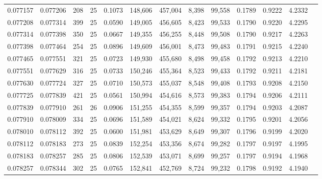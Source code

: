 \begin{tabular}{rrrrrrrrrrrrr}
0.077157 & 0.077206 &   208 &  25 &                                     0.1073 & 148,606 & 457,004 &   8,398 &  99,558 & 0.1789 & 0.9222 & 4.2332 \\
0.077208 & 0.077314 &   399 &  25 &                                     0.0590 & 149,005 & 456,605 &   8,423 &  99,533 & 0.1790 & 0.9220 & 4.2295 \\
0.077314 & 0.077398 &   350 &  25 &                                     0.0667 & 149,355 & 456,255 &   8,448 &  99,508 & 0.1790 & 0.9217 & 4.2263 \\
0.077398 & 0.077464 &   254 &  25 &                                     0.0896 & 149,609 & 456,001 &   8,473 &  99,483 & 0.1791 & 0.9215 & 4.2240 \\
0.077465 & 0.077551 &   321 &  25 &                                     0.0723 & 149,930 & 455,680 &   8,498 &  99,458 & 0.1792 & 0.9213 & 4.2210 \\
0.077551 & 0.077629 &   316 &  25 &                                     0.0733 & 150,246 & 455,364 &   8,523 &  99,433 & 0.1792 & 0.9211 & 4.2181 \\
0.077630 & 0.077724 &   327 &  25 &                                     0.0710 & 150,573 & 455,037 &   8,548 &  99,408 & 0.1793 & 0.9208 & 4.2150 \\
0.077725 & 0.077839 &   421 &  25 &                                     0.0561 & 150,994 & 454,616 &   8,573 &  99,383 & 0.1794 & 0.9206 & 4.2111 \\
0.077839 & 0.077910 &   261 &  26 &                                     0.0906 & 151,255 & 454,355 &   8,599 &  99,357 & 0.1794 & 0.9203 & 4.2087 \\
0.077910 & 0.078009 &   334 &  25 &                                     0.0696 & 151,589 & 454,021 &   8,624 &  99,332 & 0.1795 & 0.9201 & 4.2056 \\
0.078010 & 0.078112 &   392 &  25 &                                     0.0600 & 151,981 & 453,629 &   8,649 &  99,307 & 0.1796 & 0.9199 & 4.2020 \\
0.078112 & 0.078183 &   273 &  25 &                                     0.0839 & 152,254 & 453,356 &   8,674 &  99,282 & 0.1797 & 0.9197 & 4.1995 \\
0.078183 & 0.078257 &   285 &  25 &                                     0.0806 & 152,539 & 453,071 &   8,699 &  99,257 & 0.1797 & 0.9194 & 4.1968 \\
0.078257 & 0.078344 &   302 &  25 &                                     0.0765 & 152,841 & 452,769 &   8,724 &  99,232 & 0.1798 & 0.9192 & 4.1940 \\

\end{tabular}
